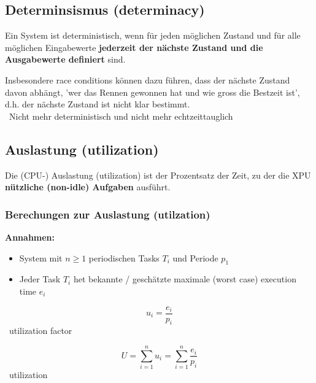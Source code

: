 \subsection{Determinsismus (determinacy)}

Ein System ist deterministisch, wenn für jeden möglichen Zustand und für alle möglichen Eingabewerte
\textbf{jederzeit der nächste Zustand und die Ausgabewerte definiert} sind.

\vspace{0.2cm}

Insbesondere race conditions können dazu führen, dass der nächste Zustand davon abhängt, 'wer das
Rennen gewonnen hat und wie gross die Bestzeit ist', d.h. der nächste Zustand ist nicht klar bestimmt.\\
\textrightarrow\ Nicht mehr deterministisch und nicht mehr echtzeittauglich


\subsection{Auslastung (utilization)}

Die (CPU-) Auslastung (utilization) ist der Prozentsatz der Zeit, zu der die XPU \textbf{nützliche (non-idle) Aufgaben} ausführt. 


\subsubsection{Berechungen zur Auslastung (utilzation)}

\textbf{Annahmen:}

\begin{itemize}
    \item System mit $n \geq 1$ periodischen Tasks $T_i$ und Periode $p_1$
    \item Jeder Task $T_i$ het bekannte / geschätzte maximale (worst case) execution time $e_i$
\end{itemize}

\vspace{0.2cm}

\begin{minipage}[t]{0.48\columnwidth}
    \begin{center}
        $$ u_i = \frac{e_i}{p_i} $$
        \textrightarrow\ utilization factor
    \end{center}
\end{minipage}
\hfill
\begin{minipage}[t]{0.48\columnwidth}
    \begin{center}
        $$ U = \sum\limits_{i=1}^n u_i = \sum\limits_{i=1}^n \frac{e_i}{p_i} $$
        \textrightarrow\ utilization
    \end{center}
\end{minipage}

